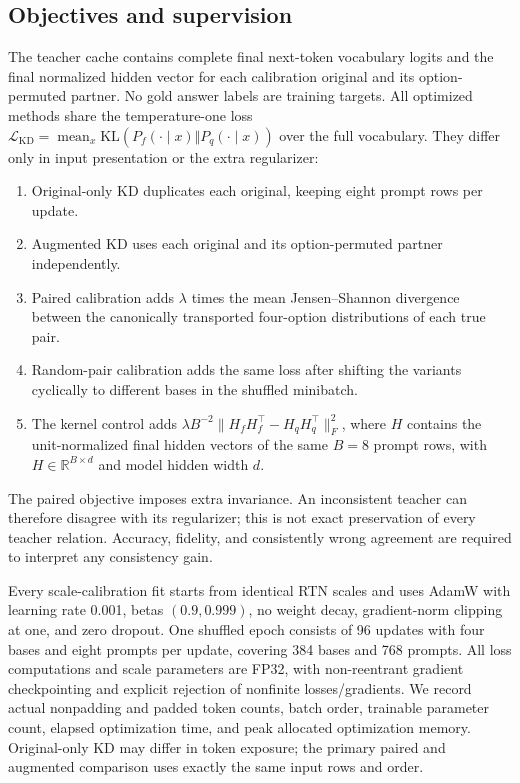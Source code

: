 \documentclass[11pt]{article}
\begin{document}
\subsection{Objectives and supervision}
The teacher cache contains complete final next-token vocabulary logits and
the final normalized hidden vector for each calibration original and its
option-permuted partner. No gold answer labels are training targets.
All optimized methods share the temperature-one loss
$\mathcal L_{\mathrm{KD}}=\operatorname{mean}_x
 \mathrm{KL}(P_f(\cdot\mid x)\Vert P_q(\cdot\mid x))$ over the full vocabulary.
They differ only in input presentation or the extra regularizer:
\begin{enumerate}
\item Original-only KD duplicates each original, keeping eight prompt rows
per update.
\item Augmented KD uses each original and its option-permuted partner
independently.
\item Paired calibration adds $\lambda$ times the mean Jensen--Shannon
divergence between the canonically transported four-option distributions
of each true pair.
\item Random-pair calibration adds the same loss after shifting the variants
cyclically to different bases in the shuffled minibatch.
\item The kernel control adds $\lambda B^{-2}\|H_fH_f^\top-H_qH_q^\top\|_F^2$,
where $H$ contains the unit-normalized final hidden vectors of the same
$B=8$ prompt rows, with $H\in\mathbb{R}^{B\times d}$ and model hidden width $d$.
\end{enumerate}
The paired objective imposes extra invariance. An inconsistent teacher can
therefore disagree with its regularizer; this is not exact preservation of
every teacher relation. Accuracy, fidelity, and consistently wrong agreement
are required to interpret any consistency gain.

Every scale-calibration fit starts from identical RTN scales and uses AdamW with learning rate
0.001, betas $(0.9,0.999)$, no weight decay, gradient-norm clipping at one,
and zero dropout. One shuffled epoch consists of 96 updates with four bases
and eight prompts per update, covering 384 bases and 768 prompts.
All loss computations and scale parameters are FP32, with non-reentrant
gradient checkpointing and explicit rejection of nonfinite losses/gradients.
We record actual nonpadding and padded token counts, batch order, trainable
parameter count, elapsed optimization time, and peak allocated optimization
memory. Original-only KD may differ in token exposure; the primary paired
and augmented comparison uses exactly the same input rows and order.
\end{document}
